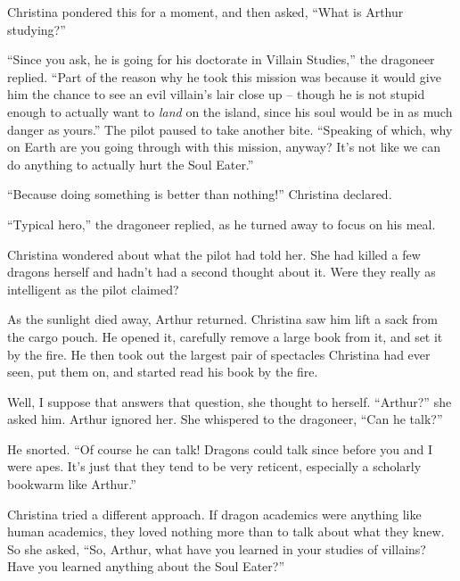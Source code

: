 \documentclass[showtrims,b6paper,draft,10pt]{memoir}
\begin{document}
Christina pondered this for a moment, and then asked, ``What is Arthur studying?''

``Since you ask, he is going for his doctorate in Villain Studies,''  the dragoneer replied.  ``Part of the reason why he took this mission was because it would give him the chance to see an evil villain's lair close up -- though he is not stupid enough to actually want to \emph{land} on the island, since his soul would be in as much danger as yours.''  The pilot paused to take another bite.  ``Speaking of which, why on Earth are you going through with this mission, anyway?  It's not like we can do anything to actually hurt the Soul Eater.''

``Because doing something is better than nothing!'' Christina declared.

``Typical hero,'' the dragoneer replied, as he turned away to focus on his meal.

Christina wondered about what the pilot had told her.  She had killed a few dragons herself and hadn't had a second thought about it.  Were they really as intelligent as the pilot claimed?

As the sunlight died away, Arthur returned.  Christina saw him lift a sack from the cargo pouch.  He opened it, carefully remove a large book from it, and set it by the fire.  He then took out the largest pair of spectacles Christina had ever seen, put them on, and started read his book by the fire.

Well, I suppose that answers that question, she thought to herself.  ``Arthur?'' she asked him.  Arthur ignored her.  She whispered to the dragoneer, ``Can he talk?''

He snorted.  ``Of course he can talk!  Dragons could talk since before you and I were apes.  It's just that they tend to be very reticent, especially a scholarly bookwarm like Arthur.''

Christina tried a different approach.  If dragon academics were anything like human academics, they loved nothing more than to talk about what they knew.  So she asked, ``So, Arthur, what have you learned in your studies of villains?  Have you learned anything about the Soul Eater?''
\end{document}
